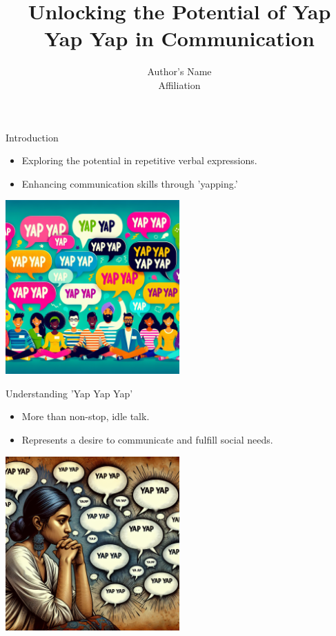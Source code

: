 \documentclass{beamer}
\title{Unlocking the Potential of Yap Yap Yap in Communication}
\author{Author's Name \\ \small Affiliation}
\date{}
\begin{document}
{
\begin{frame}
    \titlepage
\end{frame}
}

\begin{frame}{Introduction}
\begin{itemize}
    \item Exploring the potential in repetitive verbal expressions.
    \item Enhancing communication skills through 'yapping.'
\end{itemize}
\centering
\includegraphics[width=0.5\textwidth]{./images/introduction.png}
\end{frame}

\begin{frame}{Understanding 'Yap Yap Yap'}
\begin{itemize}
    \item More than non-stop, idle talk.
    \item Represents a desire to communicate and fulfill social needs.
\end{itemize}
\centering
\includegraphics[width=0.5\textwidth]{./images/understanding.png}
\end{frame}
\end{document}
